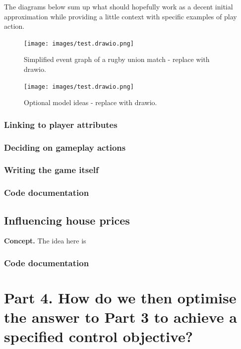 \documentclass{book}
\begin{document}
The diagrams below sum up what should hopefully work as a decent initial approximation while providing a little context with specific examples of play action.

\begin{figure}[h]
\texttt{[image: images/test.drawio.png]}
\caption{Simplified event graph of a rugby union match - replace with drawio.}
\label{fig:event-graph}
\end{figure}

\begin{figure}[h]
\texttt{[image: images/test.drawio.png]}
\caption{Optional model ideas - replace with drawio.}
\label{fig:model-ideas}
\end{figure}

\section{\sffamily Linking to player attributes}

\section{\sffamily Deciding on gameplay actions}

\section{\sffamily Writing the game itself}

\section{\sffamily Code documentation}


\chapter{\sffamily Influencing house prices}

{\bfseries\sffamily Concept.} The idea here is 


\section{\sffamily Code documentation}


\part*{{\sffamily  Part 4. {\color{gray75} How do we then optimise the answer to Part 3 to achieve a specified control objective?}}}
\end{document}
